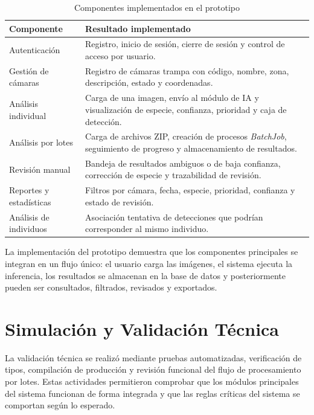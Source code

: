 \begin{table}[H]
\centering
\caption{Componentes implementados en el prototipo}
\label{tab:componentes_implementados}
\begin{tabularx}{\textwidth}{lX}
\toprule
\textbf{Componente} & \textbf{Resultado implementado} \\
\midrule
Autenticación & Registro, inicio de sesión, cierre de sesión y control de acceso por usuario. \\
Gestión de cámaras & Registro de cámaras trampa con código, nombre, zona, descripción, estado y coordenadas. \\
Análisis individual & Carga de una imagen, envío al módulo de IA y visualización de especie, confianza, prioridad y caja de detección. \\
Análisis por lotes & Carga de archivos ZIP, creación de procesos \textit{BatchJob}, seguimiento de progreso y almacenamiento de resultados. \\
Revisión manual & Bandeja de resultados ambiguos o de baja confianza, corrección de especie y trazabilidad de revisión. \\
Reportes y estadísticas & Filtros por cámara, fecha, especie, prioridad, confianza y estado de revisión. \\
Análisis de individuos & Asociación tentativa de detecciones que podrían corresponder al mismo individuo. \\
\bottomrule
\end{tabularx}
\end{table}

La implementación del prototipo demuestra que los componentes principales se integran en un flujo único: el usuario carga las imágenes, el sistema ejecuta la inferencia, los resultados se almacenan en la base de datos y posteriormente pueden ser consultados, filtrados, revisados y exportados.

\section{Simulación y Validación Técnica}
\label{sec:simulacion_validacion_tecnica}

La validación técnica se realizó mediante pruebas automatizadas, verificación de tipos, compilación de producción y revisión funcional del flujo de procesamiento por lotes. Estas actividades permitieron comprobar que los módulos principales del sistema funcionan de forma integrada y que las reglas críticas del sistema se comportan según lo esperado.

